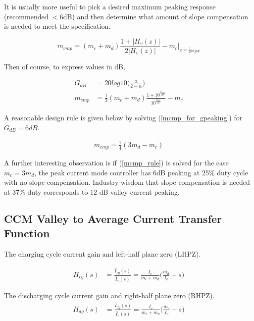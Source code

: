 \documentclass{scrartcl}
\begin{document}
		It is usually more useful to pick a desired maximum peaking response (recommended $<6$dB) and then determine what amount of slope compensation is needed to meet the specification.

		\begin{equation}
		m_{cmp} = (m_c + m_d) \frac{1 + |H_v(z)|}{2|H_v(z)|} - m_c \bigg|_{z=\frac{1}{2}\omega_{SW}}
		\end{equation}
		
		Then of course, to express values in dB,
		
		\begin{align}
		G_{dB} &= 20log10\bigg(\frac{\alpha}{2-\alpha}\bigg)\label{Gpeaking}\\
		m_{cmp} &= \frac{1}{2}(m_c + m_d) \frac{1 + 10^\frac{G_{dB}}{20}}{10^\frac{G_{dB}}{20}}  - m_c \label{mcmp_for_gpeaking}
		\end{align}
		
		A reasonable design rule is given below by solving (\ref{mcmp_for_gpeaking}) for $G_{dB} = 6 dB$.
		
		\begin{align}
			m_{cmp} = \frac{1}{4}(3m_d-m_c) \label{mcmp_rule}
		\end{align}
		
		A further interesting observation is if (\ref{mcmp_rule}) is solved for the case $m_c = 3m_d$, the peak current mode controller has 6dB peaking at 25$\%$ duty cycle with no slope compensation. Industry wisdom that slope compensation is needed at 37$\%$ duty corresponds to 12 dB valley current peaking.
		
		\subsection{CCM Valley to Average Current Transfer Function}
		The charging cycle current gain and left-half plane zero (LHPZ).

		\begin{align}
		H_{cg} (s) &= \frac{\hat{I}_{cg}(s)}{\hat{I}_{v}(s)} =\frac{I_{v}}{m_c + m_d}
		\big (\frac{m_d}{I_{v}} + s \big )
		\label{LHPZ_s_raw}
		\end{align}
		
		The discharging cycle current gain and right-half plane zero (RHPZ).
		\begin{align}
		H_{dg} (s) &= \frac{\hat{I}_{dg}(s)}{\hat{I}_{v}(s)} =\frac{I_{v}}{m_c + m_d}
		\big (\frac{m_c}{I_{v}} - s \big )
		\label{RHPZ_s_raw}
		\end{align}
\end{document}

